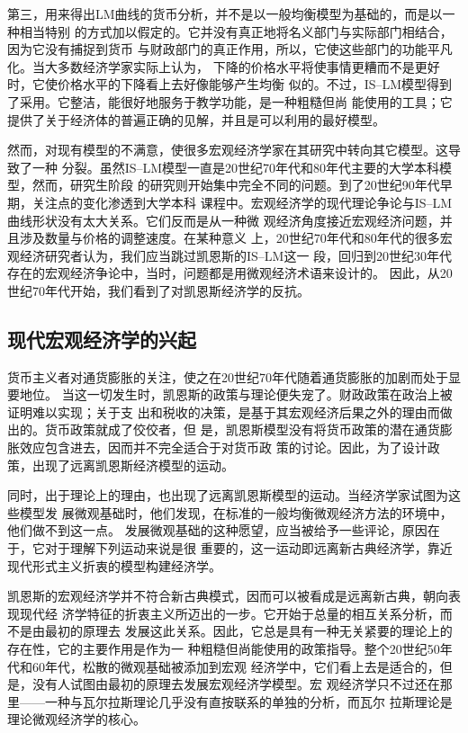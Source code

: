 第三，用来得出LM曲线的货币分析，并不是以一般均衡模型为基础的，而是以一种相当特别
的方式加以假定的。它并没有真正地将名义部门与实际部门相结合，因为它没有捕捉到货币
与财政部门的真正作用，所以，它使这些部门的功能平凡化。当大多数经济学家实际上认为，
下降的价格水平将使事情更糟而不是更好时，它使价格水平的下降看上去好像能够产生均衡
似的。不过，IS--LM模型得到了采用。它整洁，能很好地服务于教学功能，是一种粗糙但尚
能使用的工具；它提供了关于经济体的普遍正确的见解，并且是可以利用的最好模型。

然而，对现有模型的不满意，使很多宏观经济学家在其研究中转向其它模型。这导致了一种
分裂。虽然IS--LM模型一直是20世纪70年代和80年代主要的大学本科模型，然而，研究生阶段
的研究则开始集中完全不同的问题。到了20世纪90年代早期，关注点的变化渗透到大学本科
课程中。宏观经济学的现代理论争论与IS--LM曲线形状没有太大关系。它们反而是从一种微
观经济角度接近宏观经济问题，并且涉及数量与价格的调整速度。在某种意义
上，20世纪70年代和80年代的很多宏观经济研究者认为，我们应当跳过凯恩斯的IS--LM这一
段，回归到20世纪30年代存在的宏观经济争论中，当时，问题都是用微观经济术语来设计的。
因此，从20世纪70年代开始，我们看到了对凯恩斯经济学的反抗。

\subsection{现代宏观经济学的兴起}

货币主义者对通货膨胀的关注，使之在20世纪70年代随着通货膨胀的加剧而处于显要地位。
当这一切发生时，凯恩斯的政策与理论便失宠了。财政政策在政治上被证明难以实现；关于支
出和税收的决策，是基于其宏观经济后果之外的理由而做出的。货币政策就成了佼佼者，但
是，凯恩斯模型没有将货币政策的潜在通货膨胀效应包含进去，因而并不完全适合于对货币政
策的讨论。因此，为了设计政策，出现了远离凯恩斯经济模型的运动。

同时，出于理论上的理由，也出现了远离凯恩斯模型的运动。当经济学家试图为这些模型发
展微观基础时，他们发现，在标准的一般均衡微观经济方法的环境中，他们做不到这一点。
发展微观基础的这种愿望，应当被给予一些评论，原因在于，它对于理解下列运动来说是很
重要的，这一运动即远离新古典经济学，靠近现代形式主义折衷的模型构建经济学。

凯恩斯的宏观经济学并不符合新古典模式，因而可以被看成是远离新古典，朝向表现现代经
济学特征的折衷主义所迈出的一步。它开始于总量的相互关系分析，而不是由最初的原理去
发展这此关系。因此，它总是具有一种无关紧要的理论上的存在性，它的主要作用是作为一
种粗糙但尚能使用的政策指导。整个20世纪50年代和60年代，松散的微观基础被添加到宏观
经济学中，它们看上去是适合的，但是，没有人试图由最初的原理去发展宏观经济学模型。宏
观经济学只不过还在那里——一种与瓦尔拉斯理论几乎没有直按联系的单独的分析，而瓦尔
拉斯理论是理论微观经济学的核心。

